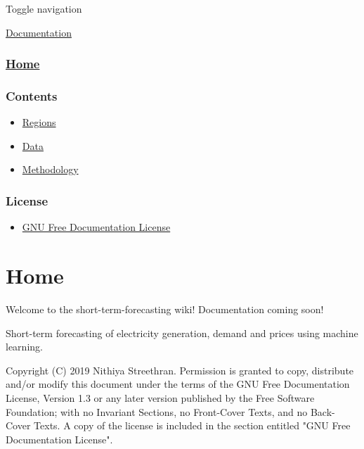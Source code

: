 {Toggle navigation} {} {} {}

\protect\hyperlink{page-top}{Documentation}

\hypertarget{navbar}{}

\hypertarget{documentation-container}{}
\hypertarget{scroll-spy}{}
{}

\hypertarget{home}{%
\subsubsection{\texorpdfstring{\protect\hyperlink{Home}{Home}}{Home}}\label{home}}

\hypertarget{contents}{%
\subsubsection{Contents}\label{contents}}

\begin{itemize}
\tightlist
\item
  \protect\hyperlink{Regions}{Regions}
\item
  \protect\hyperlink{Data}{Data}
\item
  \protect\hyperlink{Methodology}{Methodology}
\end{itemize}

\hypertarget{license}{%
\subsubsection{License}\label{license}}

\begin{itemize}
\tightlist
\item
  \protect\hyperlink{GNU-Free-Documentation-License}{GNU Free
  Documentation License}
\end{itemize}

\hypertarget{home-1}{%
\section{Home}\label{home-1}}

Welcome to the short-term-forecasting wiki! Documentation coming soon!

Short-term forecasting of electricity generation, demand and prices
using machine learning.

Copyright (C) 2019 Nithiya Streethran. Permission is granted to copy,
distribute and/or modify this document under the terms of the GNU Free
Documentation License, Version 1.3 or any later version published by the
Free Software Foundation; with no Invariant Sections, no Front-Cover
Texts, and no Back-Cover Texts. A copy of the license is included in the
section entitled "GNU Free Documentation License".

